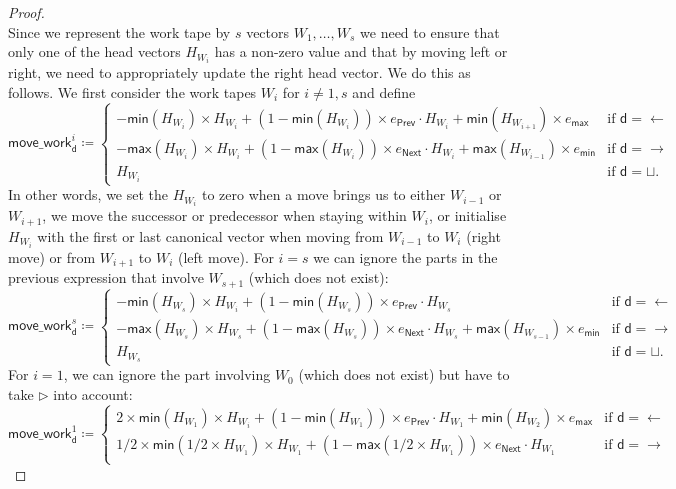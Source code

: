 \begin{proof}
$$$$
Since we represent the work tape by $s$ vectors $W_1,\ldots,W_s$ we need to ensure that only one 
of the head vectors $H_{W_i}$ has a non-zero value and that by moving left or right, we need to 
appropriately update the right head vector. We do this as follows. We first consider the work tapes 
$W_i$ for $i\neq 1,s$ and define
$$
\mathsf{move\_work}^i_{\mathsf{d}}\coloneqq 
\begin{cases}
	-\mathsf{min}(H_{W_i})\times H_{W_i} + (1-\mathsf{min}(H_{W_i}))\times e_{\mathsf{Prev}}\cdot H_{W_i} + \mathsf{min}(H_{W_{i+1}})\times e_{\mathsf{max}} & \text{if $\mathsf{d}=\leftarrow$}\\
		-\mathsf{max}(H_{W_i})\times H_{W_i} + (1-\mathsf{max}(H_{W_i}))\times e_{\mathsf{Next}}\cdot H_{W_i} + \mathsf{max}(H_{W_{i-1}})\times e_{\mathsf{min}} & \text{if $\mathsf{d}=\rightarrow$}\\
	H_{W_i} & \text{if $\mathsf{d}=\sqcup$}. 	
\end{cases}
$$
In other words, we set the $H_{W_i}$ to zero when a move brings us to either $W_{i-1}$ or $W_{i+1}$, we
move the successor or predecessor when staying within $W_i$, or initialise $H_{W_i}$ with the first or 
last canonical vector when moving from $W_{i-1}$ to $W_i$ (right move) or from $W_{i+1}$ to $W_i$ (left move).
For $i=s$ we can ignore the parts in the previous expression that involve $W_{s+1}$ (which does not exist):
$$
\mathsf{move\_work}^s_{\mathsf{d}}\coloneqq 
\begin{cases}
	-\mathsf{min}(H_{W_s})\times H_{W_i} + (1-\mathsf{min}(H_{W_s}))\times e_{\mathsf{Prev}}\cdot H_{W_s}  & \text{if $\mathsf{d}=\leftarrow$}\\
		-\mathsf{max}(H_{W_s}) \times H_{W_s} + (1-\mathsf{max}(H_{W_s}))\times e_{\mathsf{Next}}\cdot H_{W_s} + \mathsf{max}(H_{W_{s-1}})\times e_{\mathsf{min}} & \text{if $\mathsf{d}=\rightarrow$}\\
	H_{W_s} & \text{if $\mathsf{d}=\sqcup$}. 	
\end{cases}
$$
For $i=1$, we can ignore the part involving $W_{0}$ (which does not exist) but have to take $\rhd$ 
into account:
$$
\mathsf{move\_work}^1_{\mathsf{d}}\coloneqq 
\begin{cases}
	2\times \mathsf{min}(H_{W_1})\times H_{W_i} + (1-\mathsf{min}(H_{W_1}))\times e_{\mathsf{Prev}}\cdot H_{W_1} + \mathsf{min}(H_{W_{2}})\times e_{\mathsf{max}} & \text{if $\mathsf{d}=\leftarrow$}\\
		1/2\times\mathsf{min}(1/2\times H_{W_1})\times H_{W_1} + (1-\mathsf{max}(1/2\times H_{W_1}))\times e_{\mathsf{Next}}\cdot H_{W_1}  & \text{if $\mathsf{d}=\rightarrow$}\\

\end{cases}$$
\end{proof}
